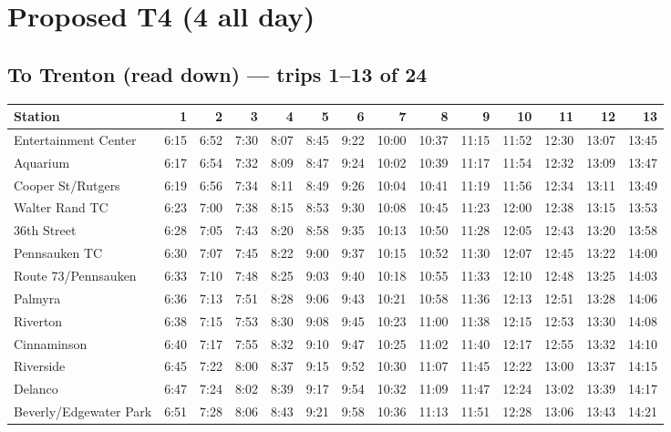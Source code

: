 \section{Proposed T4 (4 all day)}\label{tt:proposed_T4}
\subsection*{To Trenton (read down) --- trips 1--13 of 24}
\begin{center}\footnotesize\setlength{\tabcolsep}{3pt}\begin{tabular}{@{}lrrrrrrrrrrrrr@{}}\toprule
Station & 1 & 2 & 3 & 4 & 5 & 6 & 7 & 8 & 9 & 10 & 11 & 12 & 13 \\\midrule
Entertainment Center & 6:15 & 6:52 & 7:30 & 8:07 & 8:45 & 9:22 & 10:00 & 10:37 & 11:15 & 11:52 & 12:30 & 13:07 & 13:45 \\
Aquarium & 6:17 & 6:54 & 7:32 & 8:09 & 8:47 & 9:24 & 10:02 & 10:39 & 11:17 & 11:54 & 12:32 & 13:09 & 13:47 \\
Cooper St/Rutgers & 6:19 & 6:56 & 7:34 & 8:11 & 8:49 & 9:26 & 10:04 & 10:41 & 11:19 & 11:56 & 12:34 & 13:11 & 13:49 \\
Walter Rand TC & 6:23 & 7:00 & 7:38 & 8:15 & 8:53 & 9:30 & 10:08 & 10:45 & 11:23 & 12:00 & 12:38 & 13:15 & 13:53 \\
36th Street & 6:28 & 7:05 & 7:43 & 8:20 & 8:58 & 9:35 & 10:13 & 10:50 & 11:28 & 12:05 & 12:43 & 13:20 & 13:58 \\
Pennsauken TC & 6:30 & 7:07 & 7:45 & 8:22 & 9:00 & 9:37 & 10:15 & 10:52 & 11:30 & 12:07 & 12:45 & 13:22 & 14:00 \\
Route 73/Pennsauken & 6:33 & 7:10 & 7:48 & 8:25 & 9:03 & 9:40 & 10:18 & 10:55 & 11:33 & 12:10 & 12:48 & 13:25 & 14:03 \\
Palmyra & 6:36 & 7:13 & 7:51 & 8:28 & 9:06 & 9:43 & 10:21 & 10:58 & 11:36 & 12:13 & 12:51 & 13:28 & 14:06 \\
Riverton & 6:38 & 7:15 & 7:53 & 8:30 & 9:08 & 9:45 & 10:23 & 11:00 & 11:38 & 12:15 & 12:53 & 13:30 & 14:08 \\
Cinnaminson & 6:40 & 7:17 & 7:55 & 8:32 & 9:10 & 9:47 & 10:25 & 11:02 & 11:40 & 12:17 & 12:55 & 13:32 & 14:10 \\
Riverside & 6:45 & 7:22 & 8:00 & 8:37 & 9:15 & 9:52 & 10:30 & 11:07 & 11:45 & 12:22 & 13:00 & 13:37 & 14:15 \\
Delanco & 6:47 & 7:24 & 8:02 & 8:39 & 9:17 & 9:54 & 10:32 & 11:09 & 11:47 & 12:24 & 13:02 & 13:39 & 14:17 \\
Beverly/Edgewater Park & 6:51 & 7:28 & 8:06 & 8:43 & 9:21 & 9:58 & 10:36 & 11:13 & 11:51 & 12:28 & 13:06 & 13:43 & 14:21 \\

\end{tabular}
\end{center}
